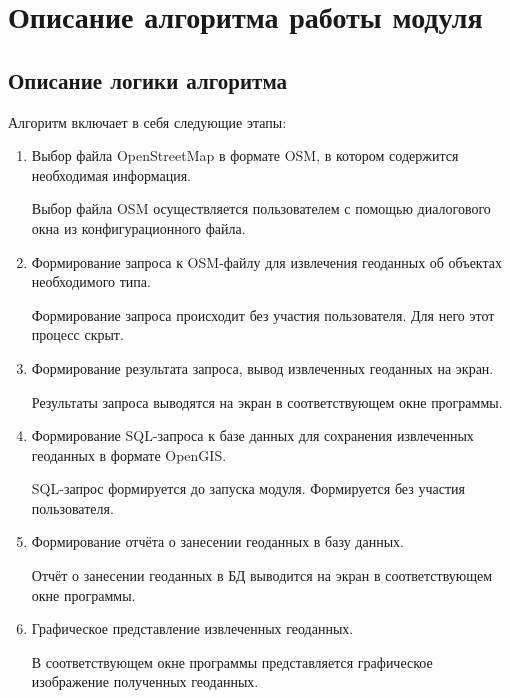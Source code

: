 \documentclass[12pt,a4paper,oneside]{article} %
\begin{document}
\newpage
\section{Описание алгоритма работы модуля}
\subsection{Описание логики алгоритма}
Алгоритм включает в себя следующие этапы:
\begin{enumerate}
\item Выбор файла OpenStreetMap в формате OSM, в котором \linebreak
содержится необходимая информация.

Выбор файла OSM осуществляется пользователем с помощью \linebreak
диалогового окна из конфигурационного файла.

\item Формирование запроса к OSM-файлу для извлечения геоданных \linebreak
об объектах необходимого типа.

Формирование запроса происходит без участия пользователя. \linebreak
Для него этот процесс скрыт.

\item Формирование результата запроса, вывод извлеченных геоданных на экран.

Результаты запроса выводятся на экран в соответствующем окне программы.

\item Формирование SQL-запроса к базе данных для сохранения извлеченных \linebreak
геоданных в формате OpenGIS.

SQL-запрос формируется до запуска модуля. Формируется без участия \linebreak
пользователя.

\item Формирование отчёта о занесении геоданных в базу данных.

Отчёт о занесении геоданных в БД выводится на экран в соответствующем \linebreak
окне программы.

\item Графическое представление извлеченных геоданных.

В соответствующем окне программы представляется графическое \linebreak
изображение полученных геоданных.

\end{enumerate}
\end{document}
